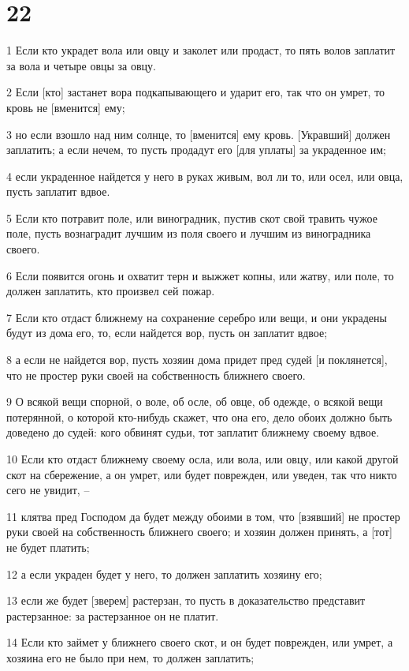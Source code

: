 \chapter{22}

\par 1 Если кто украдет вола или овцу и заколет или продаст, то пять волов заплатит за вола и четыре овцы за овцу.
\par 2 Если [кто] застанет вора подкапывающего и ударит его, так что он умрет, то кровь не [вменится] ему;
\par 3 но если взошло над ним солнце, то [вменится] ему кровь. [Укравший] должен заплатить; а если нечем, то пусть продадут его [для уплаты] за украденное им;
\par 4 если украденное найдется у него в руках живым, вол ли то, или осел, или овца, пусть заплатит вдвое.
\par 5 Если кто потравит поле, или виноградник, пустив скот свой травить чужое поле, пусть вознаградит лучшим из поля своего и лучшим из виноградника своего.
\par 6 Если появится огонь и охватит терн и выжжет копны, или жатву, или поле, то должен заплатить, кто произвел сей пожар.
\par 7 Если кто отдаст ближнему на сохранение серебро или вещи, и они украдены будут из дома его, то, если найдется вор, пусть он заплатит вдвое;
\par 8 а если не найдется вор, пусть хозяин дома придет пред судей [и поклянется], что не простер руки своей на собственность ближнего своего.
\par 9 О всякой вещи спорной, о воле, об осле, об овце, об одежде, о всякой вещи потерянной, о которой кто-нибудь скажет, что она его, дело обоих должно быть доведено до судей: кого обвинят судьи, тот заплатит ближнему своему вдвое.
\par 10 Если кто отдаст ближнему своему осла, или вола, или овцу, или какой другой скот на сбережение, а он умрет, или будет поврежден, или уведен, так что никто сего не увидит, --
\par 11 клятва пред Господом да будет между обоими в том, что [взявший] не простер руки своей на собственность ближнего своего; и хозяин должен принять, а [тот] не будет платить;
\par 12 а если украден будет у него, то должен заплатить хозяину его;
\par 13 если же будет [зверем] растерзан, то пусть в доказательство представит растерзанное: за растерзанное он не платит.
\par 14 Если кто займет у ближнего своего скот, и он будет поврежден, или умрет, а хозяина его не было при нем, то должен заплатить;

